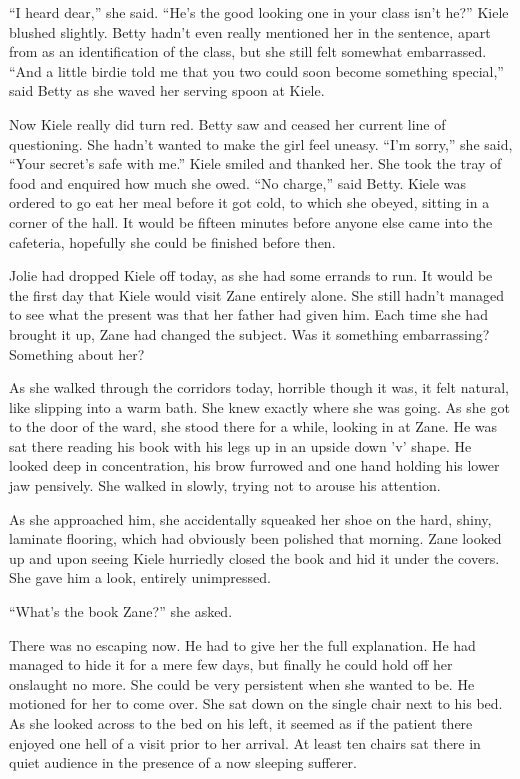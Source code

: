 ``I heard dear,'' she said.  ``He's the good looking one in your class isn't he?''  Kiele blushed slightly.  Betty hadn't even really mentioned her in the sentence, apart from as an identification of the class, but she still felt somewhat embarrassed.  ``And a little birdie told me that you two could soon become something special,'' said Betty as she waved her serving spoon at Kiele.

Now Kiele really did turn red.  Betty saw and ceased her current line of questioning.  She hadn't wanted to make the girl feel uneasy.  ``I'm sorry,'' she said, ``Your secret's safe with me.''  Kiele smiled and thanked her.  She took the tray of food and enquired how much she owed.  ``No charge,'' said Betty.  Kiele was ordered to go eat her meal before it got cold, to which she obeyed, sitting in a corner of the hall.  It would be fifteen minutes before anyone else came into the cafeteria, hopefully she could be finished before then.



\thoughtbreak



Jolie had dropped Kiele off today, as she had some errands to run.  It would be the first day that Kiele would visit Zane entirely alone.  She still hadn't managed to see what the present was that her father had given him.  Each time she had brought it up, Zane had changed the subject.  Was it something embarrassing?  Something about her?

As she walked through the corridors today, horrible though it was, it felt natural, like slipping into a warm bath.  She knew exactly where she was going.  As she got to the door of the ward, she stood there for a while, looking in at Zane.  He was sat there reading his book with his legs up in an upside down 'v' shape.  He looked deep in concentration, his brow furrowed and one hand holding his lower jaw pensively.  She walked in slowly, trying not to arouse his attention.

As she approached him, she accidentally squeaked her shoe on the hard, shiny, laminate flooring, which had obviously been polished that morning.  Zane looked up and upon seeing Kiele hurriedly closed the book and hid it under the covers.  She gave him a look, entirely unimpressed.

``What's the book Zane?'' she asked.  

There was no escaping now.  He had to give her the full explanation.  He had managed to hide it for a mere few days, but finally he could hold off her onslaught no more.  She could be very persistent when she wanted to be.  He motioned for her to come over.  She sat down on the single chair next to his bed.  As she looked across to the bed on his left, it seemed as if the patient there enjoyed one hell of a visit prior to her arrival.  At least ten chairs sat there in quiet audience in the presence of a now sleeping sufferer.

